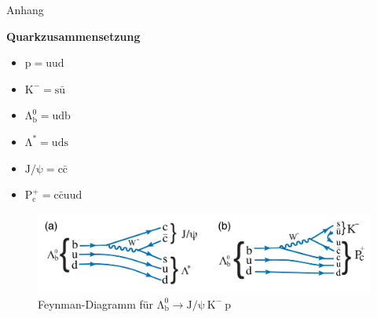 \documentclass[aspectratio=169]{beamer} %
\begin{document}
\begin{frame}
\end{frame}

  \begin{frame}{Anhang}
      \begin{minipage}{0.4\textwidth}
        \textbf{Quarkzusammensetzung}
        \begin{itemize}
          \item $\mathrm{p = uud}$
          \item $\mathrm{K^- = s\bar{u}}$
          \item $\mathrm{\Lambda_b^0 = udb}$
          \item $\mathrm{\Lambda^* = uds}$
          \item $\mathrm{J/\psi = c\bar{c}}$
          \item $\mathrm{P_c^+ = c\bar{c}uud}$
        \end{itemize}
      \end{minipage}
      \hfill
      \begin{minipage}{0.58\textwidth}
        \begin{figure}
          \centering
          \includegraphics[width=\linewidth, height=0.5\textheight, keepaspectratio]{Images/98cb82e8-f82b-43ad-8d90-3c7881558f42.jpg}
          \caption{Feynman-Diagramm für $\mathrm{\Lambda_b^0} \to \mathrm{J}/\mathrm{\psi}\:\mathrm{K}^-\:\mathrm{p}$\\\scriptsize\cite{Aaij.2015}}
        \end{figure}
      \end{minipage}
      

\end{frame}
\end{document}
